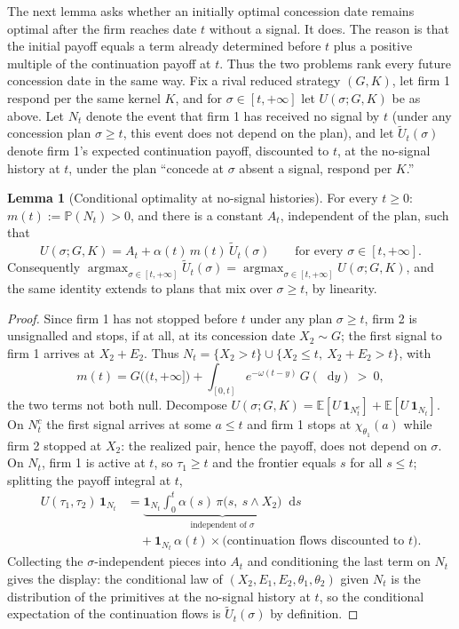 \documentclass[12pt,reqno]{article}
\newcommand{\de}{\mathop{}\!\mathrm{d}}
\newcommand{\Ex}{\mathbb{E}}
\renewcommand{\Pr}{\mathbb{P}}
\theoremstyle{definition} \newtheorem{example}{Example}
\theoremstyle{definition} \newtheorem{condition}{Condition}
\theoremstyle{definition} \newtheorem{corollary}{Corollary}
\theoremstyle{definition} \newtheorem{claim}{Claim}
\theoremstyle{definition} \newtheorem{definition}{Definition}
\theoremstyle{definition} \newtheorem{conjecture}{Conjecture}
\theoremstyle{definition} \newtheorem{Lemma}{Lemma}
\theoremstyle{definition} \newtheorem{lemma}{Lemma}
\theoremstyle{plain} \newtheorem{theorem}{Theorem}
\theoremstyle{definition} \newtheorem{assumption}{Assumption}
\theoremstyle{definition} \newtheorem*{assumptionnonumber}{Assumption}
\theoremstyle{definition} \newtheorem*{theoremNoNumber}{Proposition}
\theoremstyle{definition}
\theoremstyle{definition}\newtheorem{proposition}{Proposition}
\theoremstyle{definition} \newtheorem{result}{Result}
\theoremstyle{definition} \newtheorem*{definitionNoNumber}{Definition}
\theoremstyle{definition} \newtheorem{Definition}{Definition}
\theoremstyle{definition} \newtheorem*{DefinitionNoNumber}{Definition}
\theoremstyle{definition} \newtheorem*{fact}{Fact}
\theoremstyle{definition} \newtheorem*{property}{Property}
\DeclareMathOperator*{\argmax}{argmax}
\theoremstyle{definition} \newtheorem{remark}{Remark}
\begin{document}
The next lemma asks whether an initially optimal concession date remains optimal after the firm reaches date $t$ without a signal. It does. The reason is that the initial payoff equals a term already determined before $t$ plus a positive multiple of the continuation payoff at $t$. Thus the two problems rank every future concession date in the same way. Fix a rival reduced strategy $(G,K)$, let firm 1 respond per the same kernel $K$, and for $\sigma\in[t,+\infty]$ let $U(\sigma;G,K)$ be as above. Let $N_t$ denote the event that firm 1 has received no signal by $t$ (under any concession plan $\sigma\ge t$, this event does not depend on the plan), and let $\widetilde U_t(\sigma)$ denote firm 1's expected continuation payoff, discounted to $t$, at the no-signal history at $t$, under the plan ``concede at $\sigma$ absent a signal, respond per $K$.''

\begin{lemma}[Conditional optimality at no-signal histories]\label{lem:ex-onestep}
For every $t\ge0$: $m(t):=\Pr(N_t)>0$, and there is a constant $A_t$, independent of the plan, such that
\[
U(\sigma;G,K)=A_t+\alpha(t)\,m(t)\,\widetilde U_t(\sigma)
\qquad\text{for every }\sigma\in[t,+\infty].
\]
Consequently $\argmax_{\sigma\in[t,+\infty]}\widetilde U_t(\sigma)=\argmax_{\sigma\in[t,+\infty]}U(\sigma;G,K)$, and the same identity extends to plans that mix over $\sigma\ge t$, by linearity.
\end{lemma}

\begin{proof}
Since firm 1 has not stopped before $t$ under any plan $\sigma\ge t$, firm 2 is unsignalled and stops, if at all, at its concession date $X_2\sim G$; the first signal to firm 1 arrives at $X_2+E_2$. Thus $N_t=\{X_2>t\}\cup\{X_2\le t,\ X_2+E_2>t\}$, with
\[
m(t)=G\big((t,+\infty]\big)+\int_{[0,t]}e^{-\omega(t-y)}\,G(\de y)\ >\ 0 ,
\]
the two terms not both null. Decompose $U(\sigma;G,K)=\Ex[U\,\mathbf 1_{N_t^c}]+\Ex[U\,\mathbf 1_{N_t}]$. On $N_t^c$ the first signal arrives at some $a\le t$ and firm 1 stops at $\chi_{\theta_1}(a)$ while firm 2 stopped at $X_2$: the realized pair, hence the payoff, does not depend on $\sigma$. On $N_t$, firm 1 is active at $t$, so $\tau_1\ge t$ and the frontier equals $s$ for all $s\le t$; splitting the payoff integral at $t$,
\begin{align*}
    U(\tau_1,\tau_2)\,\mathbf 1_{N_t}
&=\underbrace{\mathbf 1_{N_t}\int_0^{t}\alpha(s)\,\pi\big(s,\ s\wedge X_2\big)\de s}_{\text{independent of }\sigma}
 \\ 
&\quad + \mathbf 1_{N_t}\,\alpha(t)\times\big(\text{continuation flows discounted to }t\big).
\end{align*}
Collecting the $\sigma$-independent pieces into $A_t$ and conditioning the last term on $N_t$ gives the display: the conditional law of $(X_2,E_1,E_2,\theta_1,\theta_2)$ given $N_t$ is the distribution of the primitives at the no-signal history at $t$, so the conditional expectation of the continuation flows is $\widetilde U_t(\sigma)$ by definition.
\end{proof}
\end{document}
